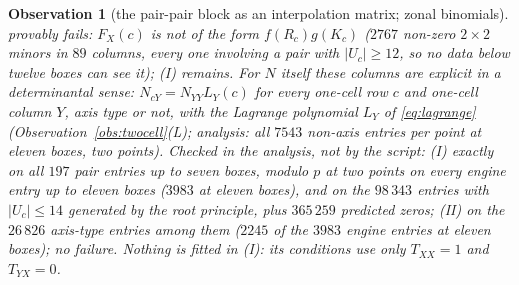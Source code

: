 \documentclass[11pt]{article}
\newtheorem{observation}{Observation}
\begin{document}
\begin{observation}[the pair-pair block as an interpolation matrix; zonal binomials]
provably fails: $F_X(c)$ is not of the form $f(R_c)g(K_c)$ ($2767$ non-zero $2\times2$ minors in $89$ columns, every one
involving a pair with $|U_c|\ge12$, so no data below twelve boxes can see it); (I) remains.  For $N$ itself these columns
are explicit in a determinantal sense: $N_{cY}=N_{YY}L_Y(c)$ for every one-cell row $c$ and one-cell column $Y$, axis type
or not, with the Lagrange polynomial $L_Y$ of \eqref{eq:lagrange} (Observation~\ref{obs:twocell}(L); analysis: all $7543$
non-axis entries per point at eleven boxes, two points).  Checked in the analysis, not
by the script: (I) exactly on all $197$ pair entries up to seven boxes, modulo $p$ at two points on every engine entry up
to eleven boxes ($3983$ at eleven boxes), and on the $98\,343$ entries with $|U_c|\le14$ generated by the root principle,
plus $365\,259$ predicted zeros; (II) on the $26\,826$ axis-type entries among them ($2245$ of the $3983$ engine entries
at eleven boxes); no failure.  Nothing is fitted in (I): its conditions use only $T_{XX}=1$ and $T_{YX}=0$.
\end{observation}
\end{document}
